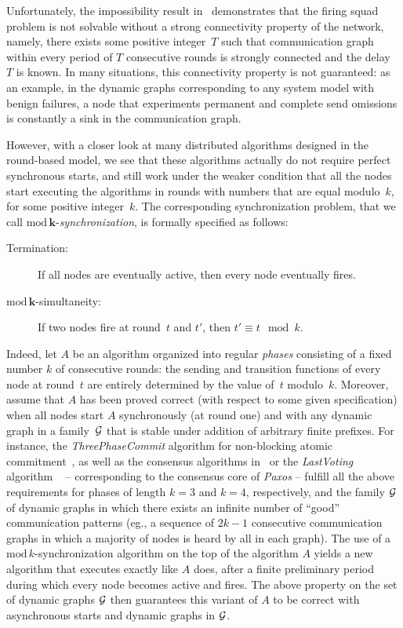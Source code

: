 \documentclass[11pt,letterpaper]{article}
\begin{document}
Unfortunately, the impossibility result in~\cite{CBM18} demonstrates that the firing squad problem
	is not solvable without a strong connectivity property of the network, namely, there exists  some positive
	integer~$T$ such that communication graph within  every period of $T$ consecutive
	rounds is strongly connected and the delay~$T$ is known.
In many situations,  this connectivity property is not guaranteed:
	as an example, in the dynamic graphs corresponding to any system model with benign failures,
	a node  that experiments permanent and complete send omissions
	is  constantly a sink in the  communication graph.

However, with a closer look at many distributed algorithms designed in the round-based model,  we see that
	these algorithms actually  do not require perfect synchronous starts, and still work under the weaker condition that all the nodes
	start executing the algorithms in rounds with numbers that are equal modulo~$k$, for some positive integer~$k$.
The corresponding synchronization problem, that we call $\mathbf{\mathrm{mod}\,k}$-\emph{synchronization}, is formally specified as follows:
	\begin{description}
	\item[Termination:]   If all nodes are eventually active, then  every node eventually fires.
	\item[ $\mathbf{\mathrm{mod}\,k}$-simultaneity:]  If two nodes fire at round~$t$ and $t'$, then $t' \equiv t \mod k$.
	\end{description}

Indeed, let $A$ be an algorithm  organized into regular  \emph{phases} consisting of  a fixed number  $k$ of consecutive rounds:
	the sending and transition functions of every node at round~$t$ are entirely determined by the value of~$t$ modulo~$k$.
Moreover, assume that $A$ has been proved correct (with respect to some given specification) when all nodes start $A$
	synchronously (at round one) and with any dynamic graph in a family~${\cal G}$ that is stable  under
	addition of arbitrary finite prefixes.
For instance, the \emph{ThreePhaseCommit} algorithm for non-blocking atomic commitment~\cite{BHG87},
	as well as the consensus algorithms in~\cite{DLS88} or the \emph{LastVoting} algorithm ~\cite{CBS09}
	-- corresponding to the consensus core of \emph{Paxos} -- fulfill all the above requirements
	for phases of length $k=3$ and $k=4$, respectively, and the family ${\cal G}$ of dynamic graphs in which
	there exists an infinite number of ``good'' communication patterns
	(eg., a sequence of $2k-1$ consecutive communication graphs  in which a majority of nodes is heard by all
	in   each graph).
The use of a $\mathrm{mod}\,k$-synchronization algorithm on the top of the algorithm $A$ yields a new algorithm that executes
	exactly like $A$ does, after a finite preliminary period during which every node becomes active and fires.
The above property on the set of dynamic graphs ${\cal G}$ then guarantees this variant of $A$ to be correct with
	asynchronous starts and dynamic graphs in ${\cal G}$.
\end{document}
